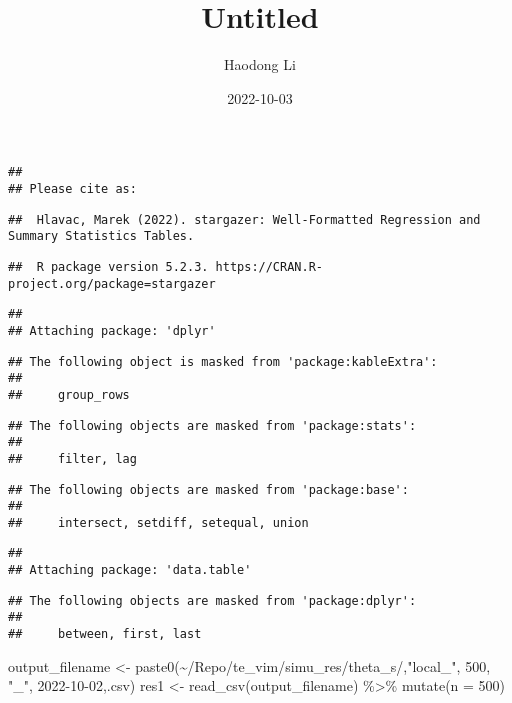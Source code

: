 \documentclass[
]{article}
\title{Untitled}
\author{Haodong Li}
\date{2022-10-03}
\newenvironment{Shaded}{\begin{snugshade}}{\end{snugshade}}
\newcommand{\AttributeTok}[1]{\textcolor[rgb]{0.77,0.63,0.00}{#1}}
\newcommand{\DecValTok}[1]{\textcolor[rgb]{0.00,0.00,0.81}{#1}}
\newcommand{\FunctionTok}[1]{\textcolor[rgb]{0.00,0.00,0.00}{#1}}
\newcommand{\NormalTok}[1]{#1}
\newcommand{\OtherTok}[1]{\textcolor[rgb]{0.56,0.35,0.01}{#1}}
\newcommand{\SpecialCharTok}[1]{\textcolor[rgb]{0.00,0.00,0.00}{#1}}
\newcommand{\StringTok}[1]{\textcolor[rgb]{0.31,0.60,0.02}{#1}}
\begin{document}
\maketitle

\begin{verbatim}
## 
## Please cite as:
\end{verbatim}

\begin{verbatim}
##  Hlavac, Marek (2022). stargazer: Well-Formatted Regression and Summary Statistics Tables.
\end{verbatim}

\begin{verbatim}
##  R package version 5.2.3. https://CRAN.R-project.org/package=stargazer
\end{verbatim}

\begin{verbatim}
## 
## Attaching package: 'dplyr'
\end{verbatim}

\begin{verbatim}
## The following object is masked from 'package:kableExtra':
## 
##     group_rows
\end{verbatim}

\begin{verbatim}
## The following objects are masked from 'package:stats':
## 
##     filter, lag
\end{verbatim}

\begin{verbatim}
## The following objects are masked from 'package:base':
## 
##     intersect, setdiff, setequal, union
\end{verbatim}

\begin{verbatim}
## 
## Attaching package: 'data.table'
\end{verbatim}

\begin{verbatim}
## The following objects are masked from 'package:dplyr':
## 
##     between, first, last
\end{verbatim}

\begin{Shaded}
\begin{Highlighting}[]
\NormalTok{output\_filename }\OtherTok{\textless{}{-}} \FunctionTok{paste0}\NormalTok{(}\StringTok{\textquotesingle{}\textasciitilde{}/Repo/te\_vim/simu\_res/theta\_s/\textquotesingle{}}\NormalTok{,}\StringTok{"local\_"}\NormalTok{, }\DecValTok{500}\NormalTok{, }\StringTok{"\_"}\NormalTok{, }\StringTok{\textquotesingle{}2022{-}10{-}02\textquotesingle{}}\NormalTok{,}\StringTok{\textquotesingle{}.csv\textquotesingle{}}\NormalTok{)}
\NormalTok{res1 }\OtherTok{\textless{}{-}} \FunctionTok{read\_csv}\NormalTok{(output\_filename) }\SpecialCharTok{\%\textgreater{}\%} \FunctionTok{mutate}\NormalTok{(}\AttributeTok{n =} \DecValTok{500}\NormalTok{)}
\end{Highlighting}
\end{Shaded}
\end{document}
